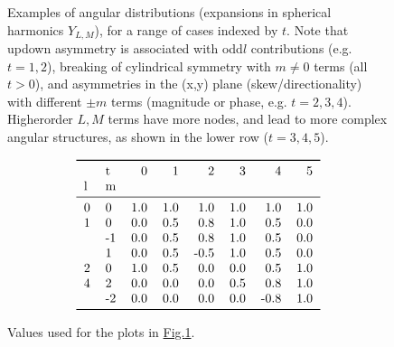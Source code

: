 \documentclass[letterpaper,table,10pt,english]{jupyterBook}
\begin{document}
\begin{figure}[htbp]
\centering
\capstart

\noindent{}
\caption{Examples of angular distributions (expansions in spherical harmonics \(Y_{L,M}\)), for a range of cases indexed by \(t\). Note that up\sphinxhyphen{}down asymmetry is associated with odd\sphinxhyphen{}\(l\) contributions (e.g. \(t=1,2\)), breaking of cylindrical symmetry with \(m\neq0\) terms (all \(t>0\)), and asymmetries in the (x,y) plane (skew/directionality) with different \(\pm m\) terms (magnitude or phase, e.g. \(t=2,3,4\)). Higher\sphinxhyphen{}order \(L,M\) terms have more nodes, and lead to more complex angular structures, as shown in the lower row (\(t=3,4,5\)).}\label{\detokenize{part1/theory_observables_intro_100723:fig-pads-example}}\end{figure}

\begin{figure}[htbp]
\centering
\capstart
\begin{equation*}
\begin{split}\begin{tabular}{llrrrrrr}
\toprule
  & t &    0 &    1 &    2 &    3 &    4 &    5 \\
l & m &      &      &      &      &      &      \\
\midrule
0 &  0 &  1.0 &  1.0 &  1.0 &  1.0 &  1.0 &  1.0 \\
1 &  0 &  0.0 &  0.5 &  0.8 &  1.0 &  0.5 &  0.0 \\
  & -1 &  0.0 &  0.5 &  0.8 &  1.0 &  0.5 &  0.0 \\
  &  1 &  0.0 &  0.5 & -0.5 &  1.0 &  0.5 &  0.0 \\
2 &  0 &  1.0 &  0.5 &  0.0 &  0.0 &  0.5 &  1.0 \\
4 &  2 &  0.0 &  0.0 &  0.0 &  0.5 &  0.8 &  1.0 \\
  & -2 &  0.0 &  0.0 &  0.0 &  0.0 & -0.8 &  1.0 \\
\bottomrule
\end{tabular}\end{split}
\end{equation*}\caption{Values used for the plots in \hyperref[\detokenize{part1/theory_observables_intro_100723:fig-pads-example}]{Fig.\@ \ref{\detokenize{part1/theory_observables_intro_100723:fig-pads-example}}}.}\label{\detokenize{part1/theory_observables_intro_100723:blm-tab}}\end{figure}
\end{document}
